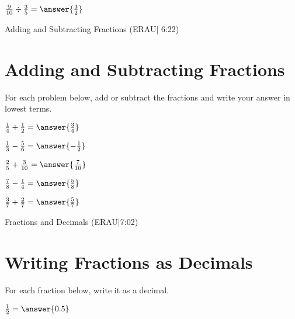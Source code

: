 \documentclass{ximera}
\begin{document}
\begin{problem}
$\frac{9}{10} \div \frac{3}{5} = \answer{\frac{3}{2}}$
\end{problem}


Adding and Subtracting Fractions (ERAU| 6:22)



\section*{Adding and Subtracting Fractions}

For each problem below, add or subtract the fractions and write your answer in lowest terms.

\begin{problem}
$\frac{1}{4} + \frac{1}{2} = \answer{\frac{3}{4}}$
\end{problem}

\begin{problem}
$\frac{1}{3} - \frac{5}{6} = \answer{-\frac{1}{2}}$
\end{problem}

\begin{problem}
$\frac{2}{5} + \frac{3}{10} = \answer{\frac{7}{10}}$
\end{problem}

\begin{problem}
$\frac{7}{8} - \frac{1}{4} = \answer{\frac{5}{8}}$
\end{problem}

\begin{problem}
$\frac{3}{7} + \frac{2}{7} = \answer{\frac{5}{7}}$
\end{problem}


Fractions and Decimals (ERAU|7:02)



\section*{Writing Fractions as Decimals}

For each fraction below, write it as a decimal.

\begin{problem}
$\frac{1}{2} = \answer{0.5}$
\end{problem}
\end{document}
